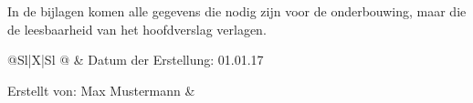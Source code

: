 
In de bijlagen komen alle gegevens die nodig zijn voor de
onderbouwing, maar die de leesbaarheid van het hoofdverslag verlagen.


\sffamily
\begin{tabularx}{\textwidth}{@{}Sl|X|Sl @{}}
	\mytoprule
	& Datum der Erstellung: 01.01.17 \par\mbox{}\par Erstellt von: Max Mustermann
	&  \\
	\mymidrule
	 \\
	\addlinespace
	 \\
	\midrule
	 \\
\end{tabularx}
